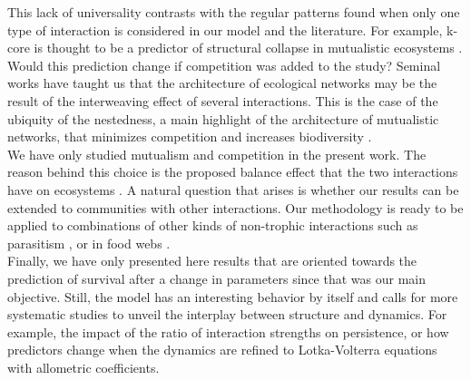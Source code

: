 This lack of universality contrasts with the regular patterns found when only one type of interaction is considered in our model and the literature. For example,  k-core is thought to be a predictor of structural collapse in mutualistic ecosystems \cite{Morone2019TheEcosystems}. Would this prediction change if competition was  added to the study? Seminal works have taught us that the architecture of ecological networks may be the result of the interweaving effect of several interactions. This is the case of the ubiquity of the nestedness, a main highlight of the architecture of mutualistic networks, that  minimizes competition and increases
biodiversity \cite{bastolla2009mutualism}.\\ 

 We have only studied mutualism and competition in the present work. The reason behind this choice is the proposed balance effect that the two interactions have on ecosystems \cite{bastolla2009mutualism,Wang2021InterspecificNetworks, Gracia-Lazaro2018TheEcosystems}. A natural question that arises is whether our results can be extended to communities with other interactions. Our methodology is ready to be applied to combinations of other kinds of non-trophic interactions such as parasitism \cite{dominguez2021structure, pilosof2017multilayer}, or in food webs \cite{Garcia-Callejas2018ThePersistence,Garcia-Callejas2021TheConstraints}.  \\

Finally, we have only presented here results that are oriented towards the prediction of survival after a change in parameters since that was our main objective. Still, the model has an interesting behavior by itself and calls for more systematic studies to unveil the interplay between structure and dynamics. For example, the impact of the ratio of interaction strengths on persistence, or how predictors change when the dynamics are refined to Lotka-Volterra equations with allometric coefficients. \\


